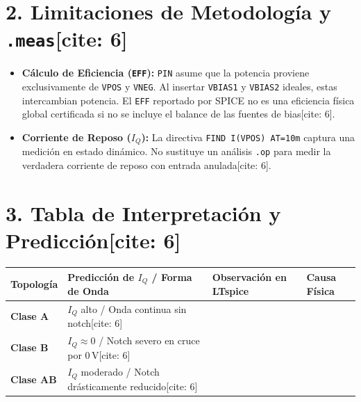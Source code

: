 \documentclass[11pt, a4paper]{article}
\begin{document}
\section*{2. Limitaciones de Metodología y \texttt{.meas}[cite: 6]}
\begin{itemize}
    \item \textbf{Cálculo de Eficiencia (\texttt{EFF}):} \texttt{PIN} asume que la potencia proviene exclusivamente de \texttt{VPOS} y \texttt{VNEG}. Al insertar \texttt{VBIAS1} y \texttt{VBIAS2} ideales, estas intercambian potencia. El \texttt{EFF} reportado por SPICE no es una eficiencia física global certificada si no se incluye el balance de las fuentes de bias[cite: 6].
    \item \textbf{Corriente de Reposo ($I_Q$):} La directiva \texttt{FIND I(VPOS) AT=10m} captura una medición en estado dinámico. No sustituye un análisis \texttt{.op} para medir la verdadera corriente de reposo con entrada anulada[cite: 6].
\end{itemize}

\section*{3. Tabla de Interpretación y Predicción[cite: 6]}
\begin{tabularx}{\textwidth}{@{}lXXX@{}}
\toprule
\textbf{Topología} & \textbf{Predicción de $I_Q$ / Forma de Onda} & \textbf{Observación en LTspice} & \textbf{Causa Física} \\ \midrule
\textbf{Clase A} & $I_Q$ alto / Onda continua sin notch[cite: 6] & & \\
\textbf{Clase B} & $I_Q \approx 0$ / Notch severo en cruce por $0\,\text{V}$[cite: 6] & & \\
\textbf{Clase AB} & $I_Q$ moderado / Notch drásticamente reducido[cite: 6] & & \\ \bottomrule
\end{tabularx}
\end{document}
